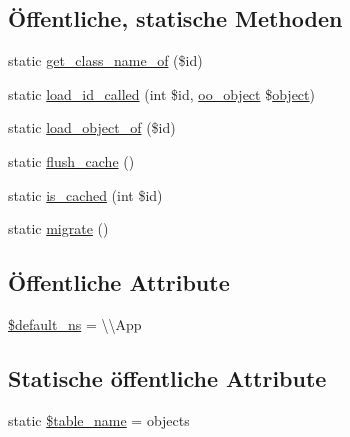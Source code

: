 \subsection*{Öffentliche, statische Methoden}
\begin{DoxyCompactItemize}
\item 
static \hyperlink{classSunhill_1_1Objects_1_1oo__object_a008bfcc646336ee5c6219b3c73f4c214}{get\+\_\+class\+\_\+name\+\_\+of} (\$id)
\item 
static \hyperlink{classSunhill_1_1Objects_1_1oo__object_a292423c979677f33e722fc4ca5ed3195}{load\+\_\+id\+\_\+called} (int \$id, \hyperlink{classSunhill_1_1Objects_1_1oo__object}{oo\+\_\+object} \$\hyperlink{classSunhill_1_1Objects_1_1oo__object_a9d967a42f26fb8cc9171e211b178359c}{object})
\item 
static \hyperlink{classSunhill_1_1Objects_1_1oo__object_ad536a3127b14d9459f6b6f3d11645673}{load\+\_\+object\+\_\+of} (\$id)
\item 
static \hyperlink{classSunhill_1_1Objects_1_1oo__object_a1c91a03be751107680149b305f828a1d}{flush\+\_\+cache} ()
\item 
static \hyperlink{classSunhill_1_1Objects_1_1oo__object_a160cdc249d3923a81878b5562a9a5a2b}{is\+\_\+cached} (int \$id)
\item 
static \hyperlink{classSunhill_1_1Objects_1_1oo__object_a6d3279a181139bb0d555cb817bef0190}{migrate} ()
\end{DoxyCompactItemize}
\subsection*{Öffentliche Attribute}
\begin{DoxyCompactItemize}
\item 
\hyperlink{classSunhill_1_1Objects_1_1oo__object_ac50aeef7ae1f78cf930cca00e6761ee7}{\$default\+\_\+ns} = \textquotesingle{}\textbackslash{}\textbackslash{}App\textquotesingle{}
\end{DoxyCompactItemize}
\subsection*{Statische öffentliche Attribute}
\begin{DoxyCompactItemize}
\item 
static \hyperlink{classSunhill_1_1Objects_1_1oo__object_a362494663b34e3eb41609e202a8b4340}{\$table\+\_\+name} = \textquotesingle{}objects\textquotesingle{}
\end{DoxyCompactItemize}
